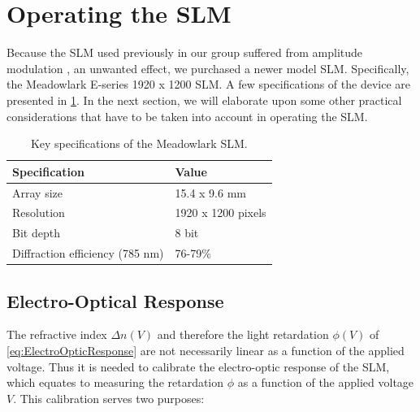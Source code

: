 \section{Operating the SLM}\label{sec:SLMoperatoin}

Because the SLM used previously in our group suffered from amplitude modulation \cite{Bijnen2015,Dijk2012}, an unwanted effect, we purchased a newer model SLM. Specifically, the Meadowlark E-series 1920 x 1200 SLM.
A few specifications of the device are presented in \cref{table:SLMspecs}.
In the next section, we will elaborate upon some other practical considerations that have to be taken into account in operating the SLM.

\begin{table}[h]
    \centering
    \caption{Key specifications of the Meadowlark SLM.}
    \label{table:SLMspecs}
    \begin{tabular}{l l}
        \textbf{Specification}              & \textbf{Value}        \\ \hline \hline
        Array size                          & 15.4 x 9.6 mm         \\ 
        Resolution                          & 1920 x 1200 pixels    \\ 
        Bit depth                           & 8 bit                 \\ 
        Diffraction efficiency (785 nm)  & 76-79\%   
    \end{tabular}
\end{table}


\subsection{Electro-Optical Response}

The refractive index $\Delta n(V)$ and therefore the light retardation $\phi(V)$ of \cref{eq:ElectroOpticResponse} are not necessarily linear as a function of the applied voltage.
Thus it is needed to calibrate the electro-optic response of the \ac{SLM}, which equates to measuring the retardation $\phi$ as a function of the applied voltage $V$. 
This calibration serves two purposes:

